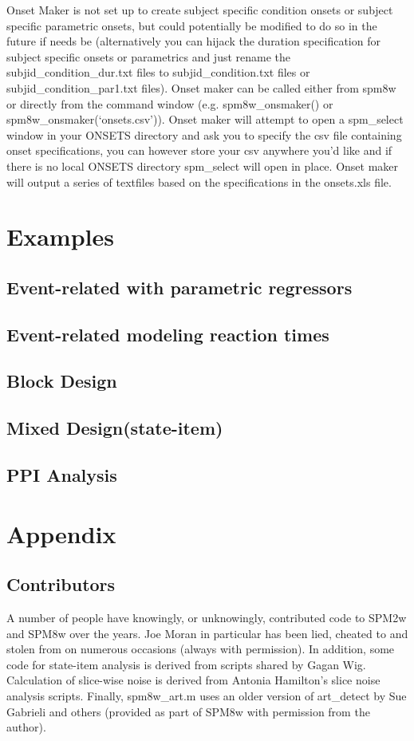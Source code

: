 \documentclass[12pt]{article}
\begin{document}
Onset Maker is not set up to create subject specific condition onsets or subject specific 
parametric onsets, but could potentially be modified to do so in the future if needs be (alternatively you can hijack the duration specification for subject specific onsets or parametrics and just rename the subjid\_condition\_dur.txt files to subjid\_condition.txt files or subjid\_condition\_par1.txt files). 
Onset maker can be called either from spm8w or directly from the command window (e.g. spm8w\_onsmaker() or spm8w\_onsmaker(‘onsets.csv’)). Onset maker will attempt to open a spm\_select window in your ONSETS directory and ask you to specify the csv file containing onset specifications, you can however store your csv anywhere you’d like and if there is no local ONSETS directory spm\_select will open in place. Onset maker will output a series of textfiles based on the specifications in the onsets.xls file. 
\newpage

\section{Examples}
\secttoc %
\subsection{Event-related with parametric regressors}
\subsection{Event-related modeling reaction times}
\subsection{Block Design}
\subsection{Mixed Design(state-item)}
\subsection{PPI Analysis}
\newpage

\section{Appendix}
\secttoc %
\subsection{Contributors}
A number of people have knowingly, or unknowingly, contributed code to SPM2w and SPM8w over the years. Joe Moran in particular has been lied, cheated to and stolen from on numerous occasions (always with permission). In addition, some code for state-item analysis is derived from scripts shared by Gagan Wig. Calculation of slice-wise noise is derived from Antonia Hamilton's slice noise analysis scripts. Finally, spm8w\_art.m uses an older version of art\_detect by Sue Gabrieli and others (provided as part of SPM8w with permission from the author). 
\end{document}

